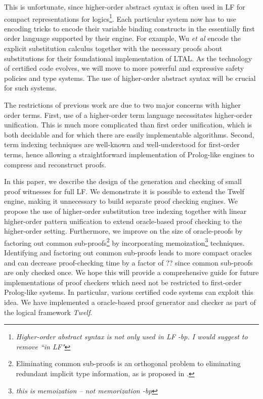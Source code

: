 \documentclass{acmconf}
\newcommand{\ednote}[1]{\footnote{\it #1}}
\begin{document}
This is unfortunate, since higher-order abstract syntax is often used
in LF for compact representations for logics\ednote{Higher-order
  abstract syntax is not only used in LF -bp. I would suggest to
  remove ``in LF"}. Each particular system now has to use encoding
tricks to encode their variable binding constructs in the essentially
first order language supported by their engine. For example, Wu {\em
  et al}\cite{Appel:PPDP03} encode the explicit substitution calculus
\cite{Abadi:POPL90} together with the necessary proofs about
substitutions for their foundational implementation of LTAL. As the
technology of certified code evolves, we will move to more powerful
and expressive safety policies and type systems. The use of
higher-order abstract syntax will be crucial for such systems.

The restrictions of previous work are due to two major concerns with
higher order terms. First, use of a higher-order term language
necessitates higher-order unification. This is much more complicated
than first order unification, which is both decidable and for which
there are easily implementable algorithms. Second, term indexing
techniques are well-known and well-understood for first-order terms,
hence allowing a straightforward implementation of Prolog-like engines
to compress and reconstruct proofs.

In this paper, we describe the design of the generation and checking
of small proof witnesses for full LF. We demonstrate it is possible to
extend the Twelf engine, making it unnecessary to build separate proof
checking engines.  We propose the use of higher-order substitution
tree indexing together with linear higher-order pattern unification to
extend oracle-based proof checking to the higher-order
setting. Furthermore, we improve on the size of oracle-proofs by
factoring out common sub-proofs\footnote{Eliminating common sub-proofs
is an orthogonal problem to eliminating redundant implicit type
information, as is proposed in \cite{Necula98lics}.} by incorporating
memoization\ednote{this is memoization -- not memorization -bp}
techniques. Identifying and factoring out common sub-proofs leads to
more compact oracles and can decrease proof-checking time by a factor
of ?? since common sub-proofs are only checked once.  We hope this
will provide a comprehensive guide for future implementations of proof
checkers which need not be restricted to first-order Prolog-like
systems. In particular, various certified code systems can exploit
this idea. We have implemented a oracle-based proof generator and
checker as part of the logical framework {\em Twelf}.
\end{document}
